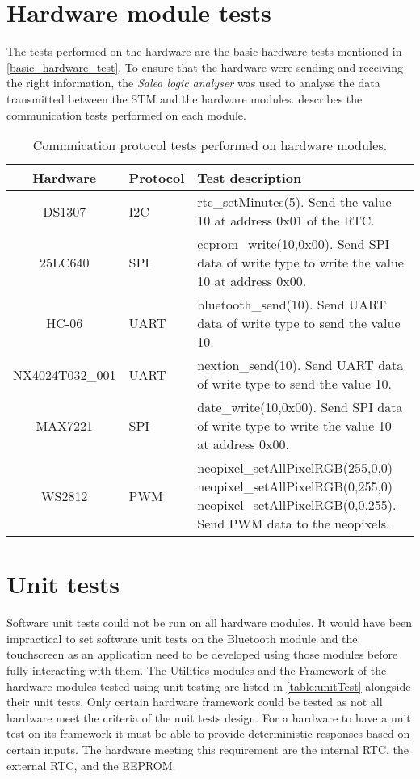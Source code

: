 \section{Hardware module tests}
The tests performed on the hardware are the basic hardware tests mentioned in \ref{basic_hardware_test}.
To ensure that the hardware were sending and receiving the right information, the \textit{Salea logic analyser} was used to analyse the data transmitted between the STM and the hardware modules. describes the communication tests performed on each module.

\begin{table}[h!]
	\centering
	\caption{Commnication protocol tests performed on hardware modules.}
	\label{table:coms_test}
	\begin{tabular}{cp{5em}p{25em}}
		\hline
		\hline
		\toprule
		\textbf{Hardware} & \textbf{Protocol} & \textbf{Test description}\\
		\hline
		\hline
		\toprule
		DS1307 & I2C & rtc\_setMinutes(5). Send the value 10 at address 0x01 of the RTC.\\ 
		\midrule
		25LC640 & SPI & eeprom\_write(10,0x00). Send SPI data of write type to write the value 10 at address 0x00.\\ 
		\midrule
		HC-06 & UART & bluetooth\_send(10). Send UART data of write type to send the value 10.\\ 
		\midrule
		NX4024T032\_001 & UART & nextion\_send(10). Send UART data of write type to send the value 10.\\ 
		\midrule
		MAX7221 & SPI &  date\_write(10,0x00). Send SPI data of write type to write the value 10 at address 0x00.\\
		\midrule
		WS2812 & PWM &  neopixel\_setAllPixelRGB(255,0,0) neopixel\_setAllPixelRGB(0,255,0) neopixel\_setAllPixelRGB(0,0,255). Send PWM data to the neopixels.\\
		\hline
		\hline
	\end{tabular}
\end{table}



\section{Unit tests}

Software unit tests could not be run on all hardware modules. It would have been impractical to set software unit tests on the Bluetooth module and the touchscreen as an application need to be developed using those modules before fully interacting with them. The Utilities modules and the Framework of the hardware modules tested using unit testing are listed in \cref{table:unitTest} alongside their unit tests. Only certain hardware framework could be tested as not all hardware meet the criteria of the unit tests design. For a hardware to have a unit test on its framework it must be able to provide deterministic responses based on certain inputs. The hardware meeting this requirement are the internal RTC, the external RTC, and the EEPROM.  

